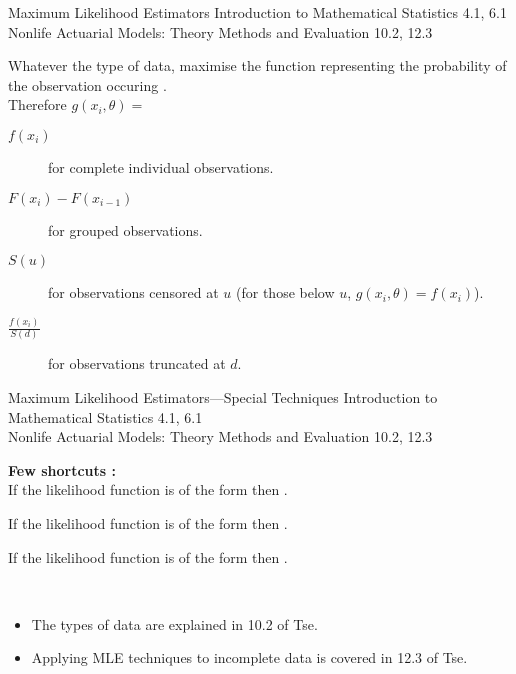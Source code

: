 \begin{CHPT_SUMM_AUTO_NUMB}[label = {L.-29}]{Maximum Likelihood Estimators}
Introduction to Mathematical Statistics 4.1, 6.1\\
Nonlife Actuarial Models: Theory Methods and Evaluation 10.2, 12.3

\tcbline

Whatever the type of data, maximise the function representing the probability of the observation occuring .\\

Therefore $g(x_{i}, \theta)	=$
\begin{description}
	\item[$f(x_{i})$]	for complete individual observations.
	\item[$F(x_{i})	-	F(x_{i	-	1})$]	for grouped observations.
	\item[$S(u)$]	for observations censored at $u$ (for those below $u$, $g(x_{i}, \theta)	=	f(x_{i})$).
	\item[$\frac{f(x_{i})}{S(d)}$]	for observations truncated at $d$.
\end{description}
\end{CHPT_SUMM_AUTO_NUMB}

\begin{CHPT_SUMM_AUTO_NUMB}[label = {L.-30}]{Maximum Likelihood Estimators---Special Techniques}
Introduction to Mathematical Statistics 4.1, 6.1	\\
Nonlife Actuarial Models: Theory Methods and Evaluation 10.2, 12.3

\tcbline

\textbf{Few shortcuts :}\\
If the likelihood function is of the form  then .

If the likelihood function is of the form  then .

If the likelihood function is of the form  then .

\

\begin{itemize}
	\item	The types of data are explained in 10.2 of Tse.
	\item	Applying MLE techniques to incomplete data is covered in 12.3 of Tse.
\end{itemize}

\end{CHPT_SUMM_AUTO_NUMB}

